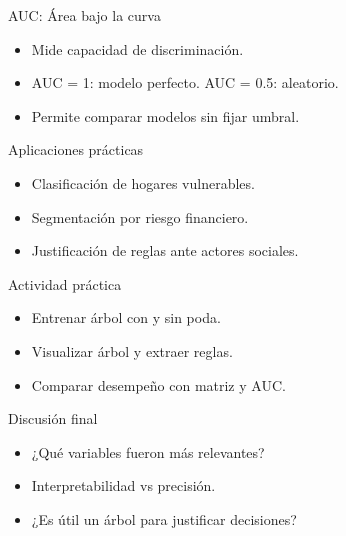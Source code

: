 \documentclass{beamer}
\begin{document}
\begin{frame}{AUC: Área bajo la curva}
\begin{itemize}
    \item Mide capacidad de discriminación.
    \item AUC = 1: modelo perfecto. AUC = 0.5: aleatorio.
    \item Permite comparar modelos sin fijar umbral.
\end{itemize}
\end{frame}

\begin{frame}{Aplicaciones prácticas}
\begin{itemize}
    \item Clasificación de hogares vulnerables.
    \item Segmentación por riesgo financiero.
    \item Justificación de reglas ante actores sociales.
\end{itemize}
\end{frame}

\begin{frame}{Actividad práctica}
\begin{itemize}
    \item Entrenar árbol con y sin poda.
    \item Visualizar árbol y extraer reglas.
    \item Comparar desempeño con matriz y AUC.
\end{itemize}
\end{frame}

\begin{frame}{Discusión final}
\begin{itemize}
    \item ¿Qué variables fueron más relevantes?
    \item Interpretabilidad vs precisión.
    \item ¿Es útil un árbol para justificar decisiones?
\end{itemize}
\end{frame}
\end{document}
